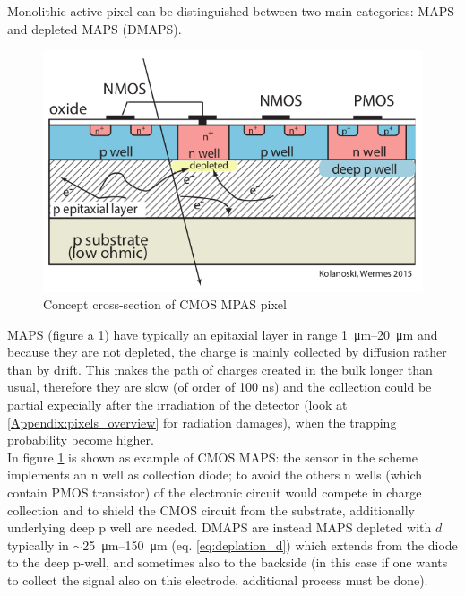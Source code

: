    Monolithic active pixel can be distinguished between two main categories: MAPS and depleted MAPS (DMAPS).\\
   \begin{figure}
      \centering
      \includegraphics[width=.4\linewidth]{figures/Pixel_detectors/MAPS_scheme.png}
      \caption{Concept cross-section of CMOS MPAS pixel}
      \label{fig:MAPS_scheme}
   \end{figure}
   MAPS (figure a \ref{fig:MAPS_scheme}) have typically an epitaxial layer in range \SIrange{1}{20}{\um} and because they are not depleted, the charge is mainly collected by diffusion rather than by drift. This makes the path of charges created in the bulk longer than usual, therefore they are slow (of order of 100 ns) and the collection could be partial expecially after the irradiation of the detector (look at \ref{Appendix:pixels_overview} for radiation damages), when the trapping probability become higher. \\
   In figure \ref{fig:MAPS_scheme} is shown as example of CMOS MAPS: the sensor in the scheme implements an n well as collection diode; to avoid the others n wells (which contain PMOS transistor) of the electronic circuit would compete in charge collection and to shield the CMOS circuit from the substrate, additionally underlying deep p well are needed.
   DMAPS are instead MAPS depleted with $d$ typically in $\sim$\SIrange{25}{150}{\um} (eq. \ref{eq:deplation_d}) which extends from the diode to the deep p-well, and sometimes also to the backside (in this case if one wants to collect the signal also on this electrode, additional process must be done).

